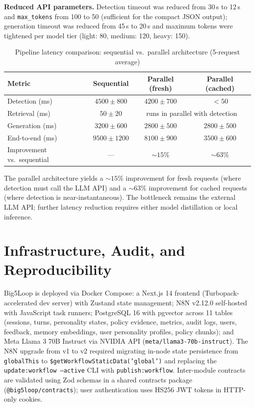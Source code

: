 \documentclass[10pt,a4paper]{report}
\begin{document}
\textbf{Reduced API parameters.} Detection timeout was reduced from 30\,s to 12\,s and \texttt{max\_tokens} from 100 to 50 (sufficient for the compact JSON output); generation timeout was reduced from 45\,s to 20\,s and maximum tokens were tightened per model tier (light: 80, medium: 120, heavy: 150).

\begin{table}[H]
\centering\small
\caption{Pipeline latency comparison: sequential vs.\ parallel architecture (5-request average)}
\label{tab:perf}
\begin{tabular}{@{}lccc@{}}
\toprule
Metric & Sequential & Parallel (fresh) & Parallel (cached) \\
\midrule
Detection (ms) & $4500\pm800$ & $4200\pm700$ & $<50$ \\
Retrieval (ms) & $50\pm20$ & \multicolumn{2}{c}{runs in parallel with detection} \\
Generation (ms) & $3200\pm600$ & $2800\pm500$ & $2800\pm500$ \\
End-to-end (ms) & $9500\pm1200$ & $8100\pm900$ & $3500\pm600$ \\
\midrule
Improvement vs.\ sequential & --- & ${\sim}15\%$ & ${\sim}63\%$ \\
\bottomrule
\end{tabular}
\end{table}

The parallel architecture yields a ${\sim}15\%$ improvement for fresh requests (where detection must call the LLM API) and a ${\sim}63\%$ improvement for cached requests (where detection is near-instantaneous). The bottleneck remains the external LLM API; further latency reduction requires either model distillation or local inference.

\section{Infrastructure, Audit, and Reproducibility}

Big5Loop is deployed via Docker Compose: a Next.js 14 frontend (Turbopack-accelerated dev server) with Zustand state management; N8N v2.12.0 self-hosted with JavaScript task runners; PostgreSQL 16 with pgvector across 11 tables (sessions, turns, personality states, policy evidence, metrics, audit logs, users, feedback, memory embeddings, user personality profiles, policy chunks); and Meta Llama 3 70B Instruct via NVIDIA API (\texttt{meta/llama3-70b-instruct}). The N8N upgrade from v1 to v2 required migrating in-node state persistence from \texttt{globalThis} to \texttt{\$getWorkflowStaticData('global')} and replacing the \texttt{update:workflow --active} CLI with \texttt{publish:workflow}. Inter-module contracts are validated using Zod schemas in a shared contracts package (\texttt{@big5loop/contracts}); user authentication uses HS256 JWT tokens in HTTP-only cookies.
\end{document}
